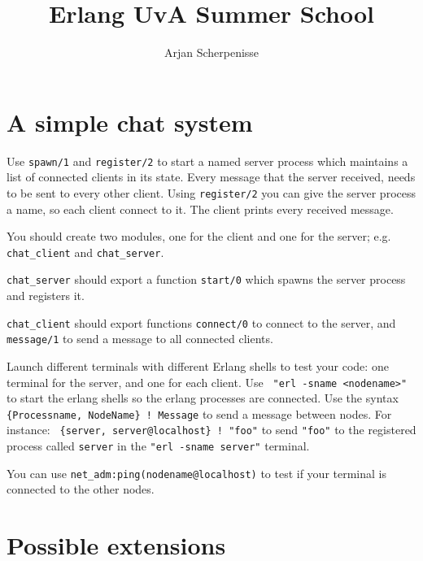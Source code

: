 \documentclass{article}
\begin{document}
\title{Erlang UvA Summer School}
\author{Arjan Scherpenisse}

\maketitle
\vspace*{2mm}

\section{A simple chat system}

Use {\tt spawn/1} and {\tt register/2} to start a named server process
which maintains a list of connected clients in its state.  Every
message that the server received, needs to be sent to every other
client. Using {\tt register/2} you can give the server process a name,
so each client  connect to it. The client prints every received
message.

You should create two modules, one for the client and one for the
server; e.g. {\tt chat\_client} and {\tt chat\_server}.

{\tt chat\_server} should export a function {\tt start/0} which spawns
the server process and registers it.

{\tt chat\_client} should export functions {\tt connect/0} to connect
to the server, and {\tt message/1} to send a message to all connected
clients.

Launch different terminals with different Erlang shells to test your
code: one terminal for the server, and one for each client. Use {\tt
  "erl -sname <nodename>"} to start the erlang shells so the erlang
processes are connected. Use the syntax {\tt \{Processname, NodeName\}
  ! Message} to send a message between nodes. For instance: {\tt
  \{server, server@localhost\} ! "foo"} to send {\tt "foo"} to the
registered process called {\tt server} in the {\tt "erl -sname
  server"} terminal.

You can use {\tt net\_adm:ping(nodename@localhost)} to test if your
terminal is connected to the other nodes.

\section{Possible extensions}
\end{document}
